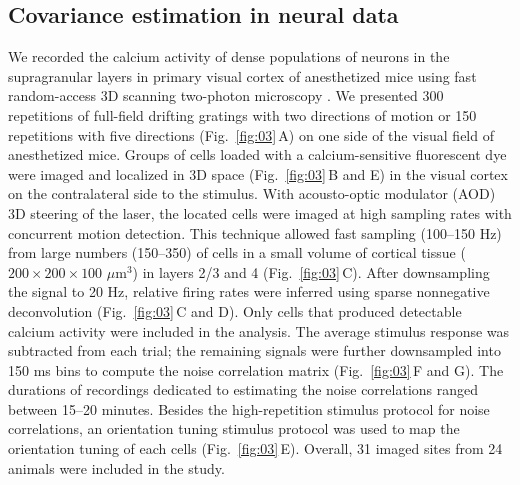 \documentclass[10pt]{article}
\begin{document}
\subsection*{Covariance estimation in neural data}

We recorded the calcium activity of dense populations of neurons in the supragranular layers in primary visual cortex of anesthetized mice using fast random-access 3D scanning two-photon microscopy \cite{Reddy:2005,Katona:2012,Cotton:2013}. We presented 300 repetitions of full-field drifting gratings with two directions of motion or 150 repetitions with five directions (Fig.~\ref{fig:03}\,A) on one side of the visual field of anesthetized mice. Groups of cells loaded with a calcium-sensitive fluorescent dye were imaged and localized in 3D space (Fig.~\ref{fig:03}\,B and E) in the visual cortex on the contralateral side to the stimulus. With acousto-optic modulator (AOD) 3D steering of the laser, the located cells were imaged at high sampling rates with concurrent motion detection.  This technique allowed fast sampling (100--150 Hz) from large numbers (150--350) of cells in a small volume of cortical tissue ($200\times200\times100$ $\mu$m$^3$) in layers 2/3 and 4 (Fig.~\ref{fig:03}\,C). After downsampling the signal to 20 Hz, relative firing rates were inferred using sparse nonnegative deconvolution \cite{Vogelstein:2010} (Fig.~\ref{fig:03}\,C and D). Only cells that produced detectable calcium activity were included in the analysis. The average stimulus response was subtracted from each trial; the remaining signals were further downsampled into 150 ms bins to compute the noise correlation matrix (Fig.~\ref{fig:03}\,F and G). The durations of recordings dedicated to estimating the noise correlations ranged between 15--20 minutes.  Besides the high-repetition stimulus protocol for noise correlations, an orientation tuning stimulus protocol was used to map the orientation tuning of each cells (Fig.~\ref{fig:03}\,E). Overall, 31 imaged sites from 24 animals were included in the study.
\end{document}
